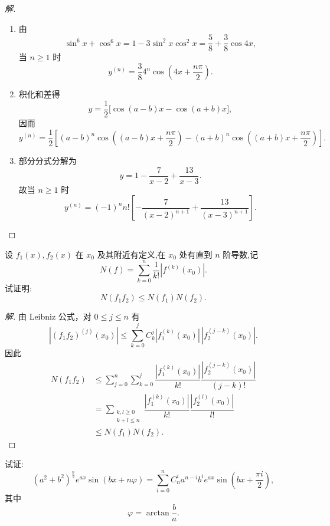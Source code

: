 \documentclass[../../数学分析培优讲义(答案版).tex]{subfiles}
\begin{document}
\begin{proof}[解]
\begin{enumerate}[label=(\arabic*)]
    \item 由
    \[
        \sin^6x+\cos^6x
        =1-3\sin^2x\cos^2x
        =\dfrac{5}{8}+\dfrac{3}{8}\cos4x,
    \]
    当 $n\geq1$ 时
    \[
        y^{(n)}=\dfrac{3}{8}4^n
        \cos\left(4x+\dfrac{n\pi}{2}\right).
    \]
    \item 积化和差得
    \[
        y=\dfrac{1}{2}\bigl[\cos(a-b)x-\cos(a+b)x\bigr],
    \]
    因而
    \[
        y^{(n)}=\dfrac{1}{2}\left[
        (a-b)^n\cos\left((a-b)x+\dfrac{n\pi}{2}\right)
        -(a+b)^n\cos\left((a+b)x+\dfrac{n\pi}{2}\right)
        \right].
    \]
    \item 部分分式分解为
    \[
        y=1-\dfrac{7}{x-2}+\dfrac{13}{x-3}.
    \]
    故当 $n\geq1$ 时
    \[
        y^{(n)}=(-1)^n n!\left[
        -\dfrac{7}{(x-2)^{n+1}}+\dfrac{13}{(x-3)^{n+1}}
        \right].
    \]
\end{enumerate}
\end{proof}


\begin{example}
设 $f_1(x),f_2(x)$ 在 $x_0$ 及其附近有定义,在 $x_0$ 处有直到 $n$ 阶导数,记
\[
    N(f)=\sum\limits_{k=0}^n\dfrac{1}{k!}|f^{(k)}(x_0)|.
\]
试证明:
\[
    N(f_1f_2)\leq N(f_1)N(f_2).
\]
\end{example}

\begin{proof}[解]
由 Leibniz 公式，对 $0\leq j\leq n$ 有
\[
    |(f_1f_2)^{(j)}(x_0)|
    \leq\sum\limits_{k=0}^{j}C_{k}^{j}
    |f_1^{(k)}(x_0)|\,|f_2^{(j-k)}(x_0)|.
\]
因此
\[
\begin{aligned}
    N(f_1f_2)
    &\leq\sum\limits_{j=0}^{n}\sum\limits_{k=0}^{j}
    \dfrac{|f_1^{(k)}(x_0)|}{k!}
    \dfrac{|f_2^{(j-k)}(x_0)|}{(j-k)!}\\
    &=\sum\limits_{\substack{k,l\geq0\\k+l\leq n}}
    \dfrac{|f_1^{(k)}(x_0)|}{k!}
    \dfrac{|f_2^{(l)}(x_0)|}{l!}\\
    &\leq N(f_1)N(f_2).
\end{aligned}
\]
\end{proof}

\begin{example}
试证:
\[
    (a^2+b^2)^{\frac{n}{2}}e^{ax}\sin(bx+n\varphi)
    =\sum\limits_{i=0}^n C_{n}^{i}a^{n-i}b^i e^{ax}
    \sin\left(bx+\dfrac{\pi i}{2}\right),
\]
其中
\[
    \varphi=\arctan\dfrac{b}{a}.
\]
\end{example}
\end{document}
